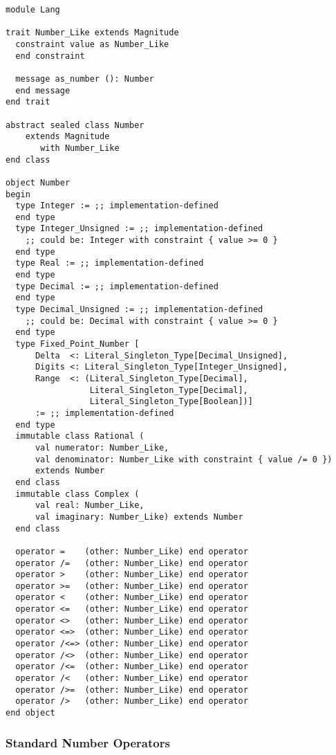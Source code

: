 \begin{lstlisting}
module Lang

trait Number_Like extends Magnitude
  constraint value as Number_Like 
  end constraint
  
  message as_number (): Number 
  end message
end trait

abstract sealed class Number 
    extends Magnitude
       with Number_Like
end class

object Number
begin
  type Integer := ;; implementation-defined
  end type
  type Integer_Unsigned := ;; implementation-defined
    ;; could be: Integer with constraint { value >= 0 }
  end type
  type Real := ;; implementation-defined
  end type
  type Decimal := ;; implementation-defined
  end type
  type Decimal_Unsigned := ;; implementation-defined
    ;; could be: Decimal with constraint { value >= 0 }
  end type
  type Fixed_Point_Number [
      Delta  <: Literal_Singleton_Type[Decimal_Unsigned],
      Digits <: Literal_Singleton_Type[Integer_Unsigned],
      Range  <: (Literal_Singleton_Type[Decimal],
                 Literal_Singleton_Type[Decimal], 
                 Literal_Singleton_Type[Boolean])]
      := ;; implementation-defined
  end type
  immutable class Rational (
      val numerator: Number_Like, 
      val denominator: Number_Like with constraint { value /= 0 }) 
      extends Number
  end class
  immutable class Complex (
      val real: Number_Like,
      val imaginary: Number_Like) extends Number
  end class
  
  operator =    (other: Number_Like) end operator
  operator /=   (other: Number_Like) end operator
  operator >    (other: Number_Like) end operator
  operator >=   (other: Number_Like) end operator
  operator <    (other: Number_Like) end operator
  operator <=   (other: Number_Like) end operator
  operator <>   (other: Number_Like) end operator
  operator <=>  (other: Number_Like) end operator
  operator /<=> (other: Number_Like) end operator
  operator /<>  (other: Number_Like) end operator
  operator /<=  (other: Number_Like) end operator
  operator /<   (other: Number_Like) end operator
  operator />=  (other: Number_Like) end operator
  operator />   (other: Number_Like) end operator
end object
\end{lstlisting}

\subsubsection{Standard Number Operators}

